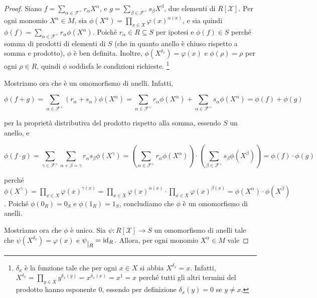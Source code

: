 \begin{proof}
	Siano $f=\sum\limits_{\alpha \in \mathcal{F}^\times} r_\alpha X^\alpha$, e $g=\sum\limits_{\beta \in \mathcal{F}^\times} s_\beta X^\beta$, due elementi di $R[\mathcal{X}]$. 
	Per ogni monomio $X^\alpha \in M$, sia $\phi(X^\alpha) = \prod\limits_{x \in X} \varphi(x)^{\alpha(x)}$, e sia quindi $\phi(f) = \sum\limits_{\alpha \in \mathcal{F}^\times} r_\alpha \phi(X^\alpha).$ 
	Poiché $r_\alpha \in R \subseteq S$ per ipotesi e $\phi(f) \in S$ perché somma di prodotti di elementi di $S$ (che in quanto anello è chiuso rispetto a somma e prodotto), $\phi$ è ben definita. 
	Inoltre, $\phi(X^{\delta_x}) = \varphi(x)$ e $\phi(\rho) = \rho$ per ogni $\rho \in R$, quindi $\phi$ soddisfa le condizioni richieste.
	\footnote{$\delta_x$ è la funzione tale che per ogni $x \in X$ si abbia $X^{\delta_x} = x$. 
  Infatti, $X^{\delta_x} = \prod\limits_{y \in X}y^{\delta_x(y)} = x^{\delta_x(x)} = x^1 = x$ 
  perché tutti gli altri termini del prodotto hanno esponente $0$, essendo per definizione $\delta_x(y) = 0$ se $y \neq x$.}

	\noindent Mostriamo ora che è un omomorfismo di anelli. 
	Infatti, 
	
	\[\phi\left(f+g\right) = \sum\limits_{\alpha \in \mathcal{F}^\times}(r_\alpha + s_\alpha) \phi(X^\alpha) = \sum\limits_{\alpha \in \mathcal{F}^\times} r_\alpha \phi(X^\alpha) + \sum\limits_{\alpha \in \mathcal{F}^\times} s_\alpha \phi(X^\alpha) = \phi(f) + \phi(g)\]
	
	\noindent per la proprietà distributiva del prodotto rispetto alla somma, essendo $S$ un anello, e
	 
	\[\phi(f\cdot g) = 
	\sum\limits_{\gamma \in \mathcal{F}^\times} \sum\limits_{\alpha + \beta = \gamma} r_\alpha s_\beta \phi(X^\gamma) = 
  \left(\sum\limits_{\alpha \in \mathcal{F}^\times} r_\alpha \phi(X^\alpha) \right) \cdot \left(\sum\limits_{\beta \in \mathcal{F}^\times} s_\beta \phi(X^\beta) \right) 
  = \phi(f)\cdot \phi(g)\] 
	
	\noindent perché $\phi(X^\gamma) = 
	\prod\limits_{x \in X} \varphi(x)^{\gamma(x)} = 
	\prod\limits_{x\in X} \varphi(x)^{\alpha(x)} \cdot \prod\limits_{x \in X} \varphi(x)^{\beta(x)} = 
	\phi(X^\alpha) \cdot \phi(X^\beta)$. 
	Poiché $\phi(0_R)=0_S$ e $ \phi(1_R)=1_S$, concludiamo che $\phi$ è un omomorfismo di anelli.
	
	\vspace{1mm}
	
	\noindent Mostriamo ora che $\phi$ è unico. 
	Sia $\psi\colon R[\mathcal{X}]\to S$ un omomorfismo di anelli tale che $\psi(X^{\delta_x})=\varphi(x)$ e $\psi \raisebox{-.5em}{$\vert_{R}$}= \operatorname{id}_R.$ 
	Allora, per ogni monomio $X^\alpha \in M$ vale 
	

\end{proof}
